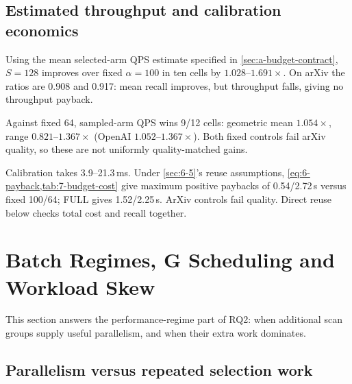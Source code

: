 \subsection{Estimated throughput and calibration economics}

Using the mean selected-arm QPS estimate specified in
\cref{sec:a-budget-contract}, $S=128$ improves over fixed $\alpha=100$
in ten cells by $1.028$--$1.691\times$. On arXiv the ratios are 0.908
and 0.917: mean recall improves, but throughput falls, giving no
throughput payback.

Against fixed 64, sampled-arm QPS wins 9/12 cells: geometric mean $1.054\times$, range $0.821$--$1.367\times$ (OpenAI $1.052$--$1.367\times$). Both fixed controls fail arXiv quality, so these are not uniformly quality-matched gains.

\begin{table}[tbp]
\centering
\caption[Sampled-calibration economics]{Calibration economics, $S=128$. Rates are kQPS and rule rate is
mean selected-arm QPS. Ratios compare with fixed 100 and fixed 64.
The ``Batches'' column gives payback relative to fixed 100 using 500
queries, or 499 for Stella; ``Never'' denotes no throughput payback.
The quality column separately marks whether fixed 100 meets the
held-out loss target.}
\label{tab:7-budget-cost}
\footnotesize\setlength{\tabcolsep}{3pt}

\end{table}

Calibration takes 3.9--21.3\,ms. Under \cref{sec:6-5}'s reuse assumptions, \cref{eq:6-payback,tab:7-budget-cost} give maximum positive paybacks of 0.54/2.72\,s versus fixed 100/64; FULL gives 1.52/2.25\,s. ArXiv controls fail quality. Direct reuse below checks total cost and recall together.



\section{Batch Regimes, G Scheduling and Workload Skew}
\label{sec:7-6}

This section answers the performance-regime part of RQ2: when additional
scan groups supply useful parallelism, and when their extra work dominates.

\subsection{Parallelism versus repeated selection work}




